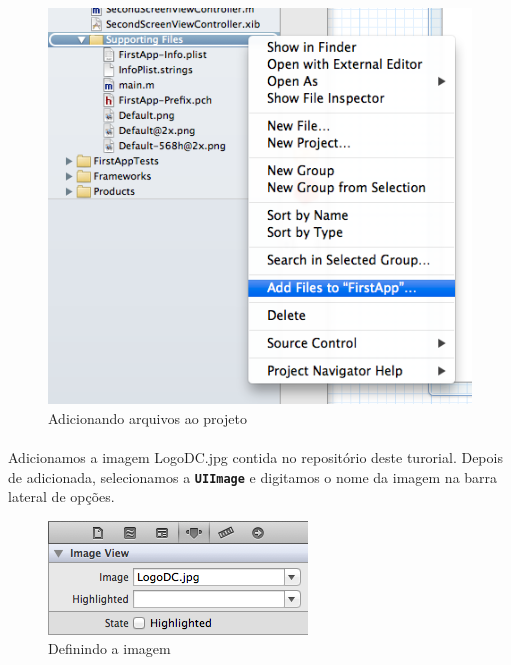 \documentclass[a4paper,12pt,brazil,doubleside]{book}
\begin{document}
\begin{figure}[h]
  \centering
  \includegraphics[totalheight=0.3\textheight]{figuras/2/add_files.png}
  \caption{Adicionando arquivos ao projeto}
  \label{fig:a}
\end{figure}

\pagebreak

\paragraph{}Adicionamos a imagem LogoDC.jpg contida no repositório deste turorial. Depois de adicionada, selecionamos a \texttt{\textbf{UIImage}} e digitamos o nome da imagem na barra lateral de opções.

\begin{figure}[h]
  \centering
  \includegraphics[totalheight=0.12\textheight]{figuras/2/image_path.png}
  \caption{Definindo a imagem}
  \label{fig:a}
\end{figure}
\end{document}
